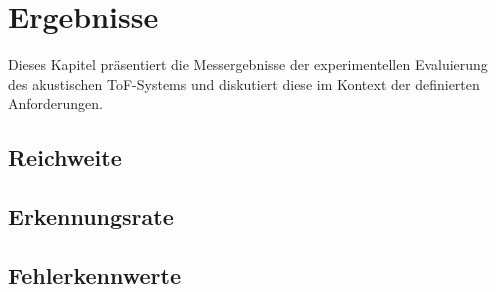 \section{Ergebnisse}

Dieses Kapitel präsentiert die Messergebnisse der experimentellen Evaluierung des akustischen ToF-Systems und diskutiert diese im Kontext der definierten Anforderungen.

\subsection{Reichweite}


\subsection{Erkennungsrate}


\subsection{Fehlerkennwerte}


